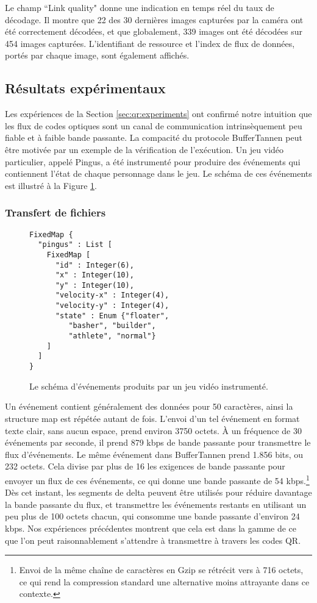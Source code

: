 Le champ ``Link quality" donne une indication en temps réel du taux de décodage. Il montre que 22 des 30 dernières images capturées par la caméra ont été correctement décodées, et que globalement, 339 images ont été décodées sur 454 images capturées. L'identifiant de ressource et l'index de flux de données, portés par chaque image, sont également affichés.

\subsection{Résultats expérimentaux}
\setcounter{paragraph}{0}

Les expériences de la Section \ref{sec:qr:experiments} ont confirmé notre intuition que les flux de codes optiques sont un canal de communication intrinsèquement peu fiable et à faible bande passante. La compacité du protocole BufferTannen peut être motivée par un exemple de la vérification de l'exécution. Un jeu vidéo particulier, appelé Pingus, a été instrumenté pour produire des événements qui contiennent l'état de chaque personnage dans le jeu. Le schéma de ces événements est illustré à la Figure \ref{fig:qr:pingus-schema}.

\subsubsection{Transfert de fichiers}

\begin{figure}
\centering
\begin{verbatim}
FixedMap {
  "pingus" : List [
    FixedMap [
      "id" : Integer(6),
      "x" : Integer(10),
      "y" : Integer(10),
      "velocity-x" : Integer(4),
      "velocity-y" : Integer(4),
      "state" : Enum {"floater",
         "basher", "builder",
         "athlete", "normal"}
    ]
  ]
}
\end{verbatim}
\caption{Le schéma d'événements produits par un jeu vidéo instrumenté.}
\label{fig:qr:pingus-schema}
\end{figure}

Un événement contient généralement des données pour 50 caractères, ainsi la structure map est répétée autant de fois. L'envoi d'un tel événement en format texte clair, sans aucun espace, prend environ 3750 octets. À un fréquence de 30 événements par seconde, il prend 879 kbps de bande passante pour transmettre le flux d'événements. Le même événement dans BufferTannen prend 1.856 bits, ou 232 octets. Cela divise par plus de 16 les exigences de bande passante pour envoyer un flux de ces événements, ce qui donne une bande passante de 54 kbps.\footnote{Envoi de la même chaîne de caractères en Gzip se rétrécit vers à 716 octets, ce qui rend la compression standard une alternative moins attrayante dans ce contexte.} Dès cet instant, les segments de delta peuvent être utilisés pour réduire davantage la bande passante du flux, et transmettre les événements restants en utilisant un peu plus de 100 octets chacun, qui consomme une bande passante d'environ 24 kbps. Nos expériences précédentes montrent que cela est dans la gamme de ce que l'on peut raisonnablement s'attendre à transmettre à travers les codes QR.

